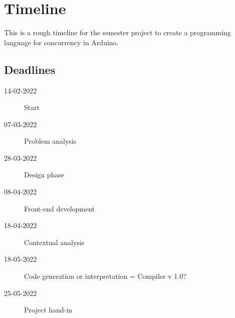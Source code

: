 \chapter{Timeline}\label{app:timeline}
This is a rough timeline for the semester project to create a programming language for concurrency in Arduino.

\section{Deadlines}

\begin{description}
\item[14-02-2022] Start
\item[07-03-2022] Problem analysis
\item[28-03-2022] Design phase
\item[08-04-2022] Front-end development
\item[18-04-2022] Contextual analysis
\item[18-05-2022] Code generation or interpretation = Compiler v 1.0?
\item[25-05-2022] Project hand-in
\end{description}
